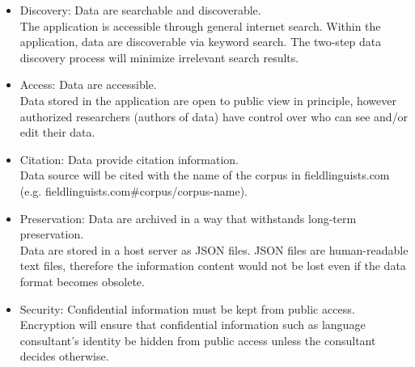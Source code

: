 \documentclass[12 pt]{article}
\begin{document}
\begin{itemize}
\item Discovery: Data are searchable and discoverable. \\ The application is accessible through general internet search. Within the application, data are discoverable via keyword search. The two-step data discovery process will minimize irrelevant search results.   

\item Access: Data are accessible. \\ Data stored in the application are open to public view in principle, however authorized researchers (authors of data) have control over who can see and/or edit their data. 

\item Citation: Data provide citation information. \\ Data source will be cited with the name of the corpus in fieldlinguists.com (e.g. fieldlinguists.com\#corpus/corpus-name).   
 
\item Preservation: Data are archived in a way that withstands long-term preservation. \\ Data are stored in a host server as JSON files. JSON files are human-readable text files, therefore the information content would not be lost even if the data format becomes obsolete. 

\item Security: Confidential information must be kept from public access. \\ Encryption will ensure that confidential information such as language consultant's identity be hidden from public access unless the consultant decides otherwise. 


\end{itemize} 


%
%
%
%
%
\end{document}
